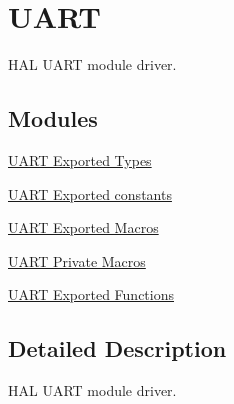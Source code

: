 \hypertarget{group___u_a_r_t}{\section{U\-A\-R\-T}
\label{group___u_a_r_t}
}


H\-A\-L U\-A\-R\-T module driver.  


\subsection*{Modules}
\begin{DoxyCompactItemize}
\item 
\hyperlink{group___u_a_r_t___exported___types}{U\-A\-R\-T Exported Types}
\item 
\hyperlink{group___u_a_r_t___exported___constants}{U\-A\-R\-T Exported constants}
\item 
\hyperlink{group___u_a_r_t___exported___macros}{U\-A\-R\-T Exported Macros}
\item 
\hyperlink{group___u_a_r_t___private___macros}{U\-A\-R\-T Private Macros}
\item 
\hyperlink{group___u_a_r_t___exported___functions}{U\-A\-R\-T Exported Functions}
\end{DoxyCompactItemize}


\subsection{Detailed Description}
H\-A\-L U\-A\-R\-T module driver. 